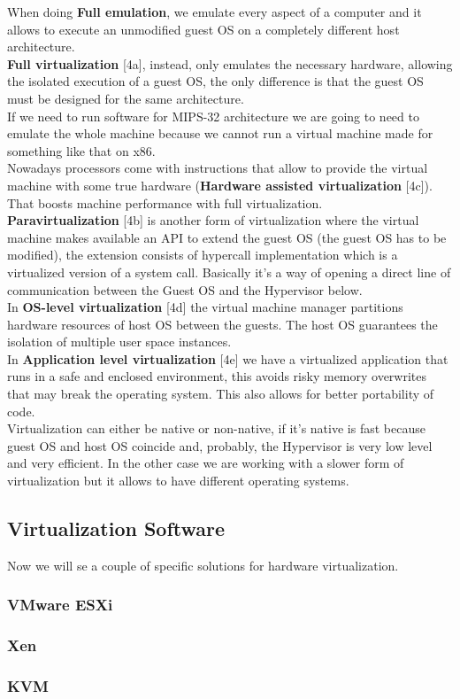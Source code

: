 When doing \textbf{Full emulation}, we emulate every aspect of a computer and it allows to execute an unmodified guest OS on a completely different host architecture. \\
\miniSpace
\textbf{Full virtualization} [4a], instead, only emulates the necessary hardware, allowing the isolated execution of a guest OS, the only difference is that the guest OS must be designed for the same architecture. \\
\miniSpace
If we need to run software for MIPS-32 architecture we are going to need to emulate the whole machine because we cannot run a virtual machine made for something like that on x86. \\
\miniSpace
Nowadays processors come with instructions that allow to provide the virtual machine with some true hardware (\textbf{Hardware assisted virtualization} [4c]). That boosts machine performance with full virtualization. \\
\miniSpace
\textbf{Paravirtualization} [4b] is another form of virtualization where the virtual machine makes available an API to extend the guest OS (the guest OS has to be modified), the extension consists of hypercall implementation which is a virtualized version of a system call. Basically it's a way of opening a direct line of communication between the Guest OS and the Hypervisor below. \\
\miniSpace
In \textbf{OS-level virtualization} [4d] the virtual machine manager partitions hardware resources of host OS between the guests. The host OS guarantees the isolation of multiple user space instances. \\
\miniSpace
In \textbf{Application level virtualization} [4e] we have a virtualized application that runs in a safe and enclosed environment, this avoids risky memory overwrites that may break the operating system. This also allows for better portability of code. \\
\smallSpace
Virtualization can either be native or non-native, if it's native is fast because guest OS and host OS coincide and, probably, the Hypervisor is very low level and very efficient. In the other case we are working with a slower form of virtualization but it allows to have different operating systems. \\

\subsection{Virtualization Software}
Now we will se a couple of specific solutions for hardware virtualization.
\subsubsection{VMware ESXi}
\subsubsection{Xen}
\subsubsection{KVM}